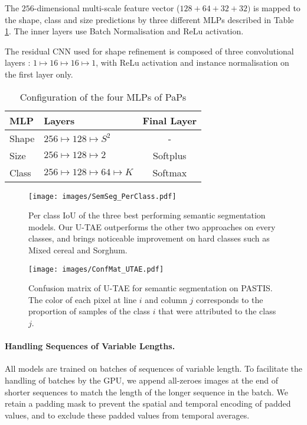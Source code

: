 The $256$-dimensional multi-scale feature vector ($128+64+32+32)$ is mapped to the shape, class and size predictions by three different MLPs described in Table \ref{tab:mlp_config}. The inner layers use Batch Normalisation and ReLu activation.

{The residual CNN used for shape refinement is composed of three convolutional layers : $1 \mapsto 16 \mapsto 16 \mapsto 1$, with ReLu activation and instance normalisation on the first layer only.}
\begin{table}[]
    \caption{Configuration of the four MLPs of PaPs}

    \centering
    \begin{tabular}{l|lc}
        MLP & Layers & Final Layer\\\midrule
        Shape & $256 \mapsto 128 \mapsto S^2$ & - \\
        Size & $256 \mapsto 128 \mapsto 2$ & Softplus\\
        Class & $256 \mapsto 128 \mapsto 64 \mapsto K$ & Softmax\\
    \end{tabular}
    \label{tab:mlp_config}
\end{table}

\begin{figure}[h!]
    \centering
    \texttt{[image: images/SemSeg\_PerClass.pdf]}
    \caption{Per class IoU of the three best performing semantic segmentation models. Our U-TAE outperforms the other two approaches on every classes, and brings noticeable improvement on hard classes such as Mixed cereal and Sorghum. }
    \label{fig:per_class}
\end{figure}


\begin{figure}[h!]
    \centering
    \texttt{[image: images/ConfMat\_UTAE.pdf]}
    \caption{Confusion matrix of U-TAE for semantic segmentation on PASTIS. The color of each pixel at line $i$ and column $j$ corresponds to the proportion of samples of the class $i$  that were attributed to the class $j$.}
    \label{fig:confmat}
\end{figure}


\paragraph{Handling Sequences of Variable Lengths.} All models are trained on batches of sequences of variable length.
To facilitate the handling of batches by the GPU, we append all-zeroes images at the end of shorter sequences to match the length of the longer sequence in the batch.
We retain a padding mask to prevent the spatial and temporal encoding of padded values, and to exclude these padded values from temporal averages.


